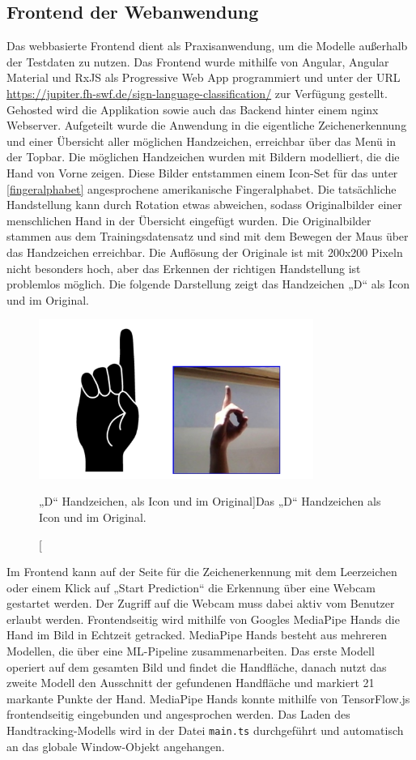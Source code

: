 \documentclass[11pt,bibliography=totocnumbered]{scrartcl}
\begin{document}
\subsection{Frontend der Webanwendung}
Das webbasierte Frontend dient als Praxisanwendung, um die Modelle außerhalb der Testdaten zu nutzen. Das Frontend wurde mithilfe von Angular, Angular Material und RxJS als Progressive Web App programmiert und unter der URL  \url{https://jupiter.fh-swf.de/sign-language-classification/} zur Verfügung gestellt. Gehosted wird die Applikation sowie auch das Backend hinter einem nginx Webserver. Aufgeteilt wurde die Anwendung in die eigentliche Zeichenerkennung und einer Übersicht aller möglichen Handzeichen, erreichbar über das Menü in der Topbar. Die möglichen Handzeichen wurden mit Bildern modelliert, die die Hand von Vorne zeigen. Diese Bilder entstammen einem Icon-Set für das unter \ref{fingeralphabet} angesprochene amerikanische Fingeralphabet. Die tatsächliche Handstellung kann durch Rotation etwas abweichen, sodass Originalbilder einer menschlichen Hand in der Übersicht eingefügt wurden. Die Originalbilder stammen aus dem Trainingsdatensatz und sind mit dem Bewegen der Maus über das Handzeichen erreichbar. Die Auflösung der Originale ist mit 200x200 Pixeln nicht besonders hoch, aber das Erkennen der richtigen Handstellung ist problemlos möglich. Die folgende Darstellung zeigt das Handzeichen „D“ als Icon und im Original.
\begin{figure}[H]
	\centering
	\includegraphics[width=0.80\textwidth]{d}
	\vspace*{-3mm}
	\caption[„D“ Handzeichen, als Icon und im Original]{Das „D“ Handzeichen als Icon und im Original.}
	\label{fig:d}
\end{figure}
Im Frontend kann auf der Seite für die Zeichenerkennung mit dem Leerzeichen oder einem Klick auf „Start Prediction“ die Erkennung über eine Webcam gestartet werden. Der Zugriff auf die Webcam muss dabei aktiv vom Benutzer erlaubt werden. Frontendseitig wird mithilfe von Googles MediaPipe Hands die Hand im Bild in Echtzeit getracked. MediaPipe Hands besteht aus mehreren Modellen, die über eine ML-Pipeline zusammenarbeiten. Das erste Modell operiert auf dem gesamten Bild und findet die Handfläche, danach nutzt das zweite Modell den Ausschnitt der gefundenen Handfläche und markiert 21 markante Punkte der Hand. MediaPipe Hands konnte mithilfe von TensorFlow.js frontendseitig eingebunden und angesprochen werden. Das Laden des Handtracking-Modells wird in der Datei \lstinline[language=pythoninline]|main.ts| durchgeführt und automatisch an das globale Window-Objekt angehangen.
\end{document}
